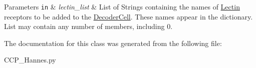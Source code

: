 \begin{DoxyParams}[1]{Parameters}
\mbox{\tt in}  & {\em lectin\+\_\+list} & List of Strings containing the names of \mbox{\hyperlink{class_c_c_p___hannes_1_1_lectin}{Lectin}} receptors to be added to the \mbox{\hyperlink{class_c_c_p___hannes_1_1_decoder_cell}{Decoder\+Cell}}. These names appear in the dictionary. List may contain any number of members, including 0. \\
\hline
\end{DoxyParams}


The documentation for this class was generated from the following file\+:\begin{DoxyCompactItemize}
\item 
C\+C\+P\+\_\+\+Hannes.\+py\end{DoxyCompactItemize}
